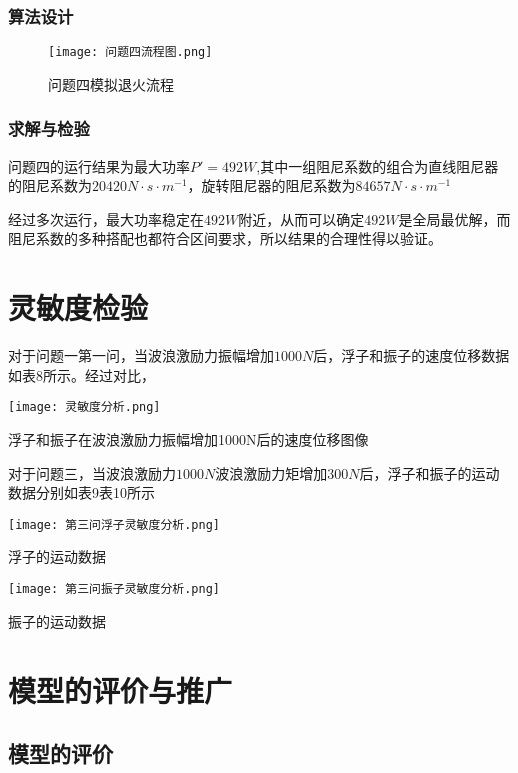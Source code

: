 \documentclass[a4paper,12pt]{article}
\begin{document}
	\subsubsection{算法设计}
	\begin{figure}[H]
		\centering
		\texttt{[image: 问题四流程图.png]}
		\caption{问题四模拟退火流程}
		\label{fig:表9}
	\end{figure}
	\subsubsection{求解与检验}
	问题四的运行结果为最大功率$P'=492W$,其中一组阻尼系数的组合为直线阻尼器的阻尼系数为$20420N\cdot s\cdot m^{-1}$，旋转阻尼器的阻尼系数为$84657N\cdot s\cdot m^{-1}$\par
	经过多次运行，最大功率稳定在$492W$附近，从而可以确定$492W$是全局最优解，而阻尼系数的多种搭配也都符合区间要求，所以结果的合理性得以验证。
	\section{灵敏度检验}
	对于问题一第一问，当波浪激励力振幅增加$1000N$后，浮子和振子的速度位移数据如表8所示。经过对比，
	\begin{table}[H]
		\centering
		\texttt{[image: 灵敏度分析.png]}
		\caption{浮子和振子在波浪激励力振幅增加1000N后的速度位移图像}
		\label{fig:表11}
	\end{table}
	对于问题三，当波浪激励力$1000N$波浪激励力矩增加$300N$后，浮子和振子的运动数据分别如表9表10所示
	\begin{table}[H]
		\centering
		\texttt{[image: 第三问浮子灵敏度分析.png]}
		\caption{浮子的运动数据}
		\label{fig:表12}
	\end{table}
	\begin{table}[H]
		\centering
		\texttt{[image: 第三问振子灵敏度分析.png]}
		\caption{振子的运动数据}
		\label{fig:表13}
	\end{table}

	\section{模型的评价与推广}
	\subsection{模型的评价}
\end{document}
